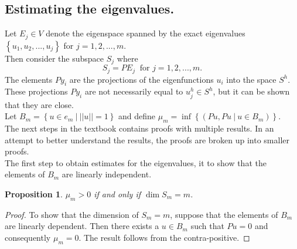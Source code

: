 \documentclass[../../main.tex]{subfiles}
\begin{document}
\subsection{Estimating the eigenvalues.}
Let $E_j \in V$ denote the eigenspace spanned by the exact eigenvalues $\left\{u_1,u_2,...,u_j \right\}$ for $j = 1,2,...,m$.\\

Then consider the subspace $S_j$ where
\begin{equation*}
	S_j = PE_j \ \text{ for } j = 1,2,...,m.
\end{equation*} The elements $Py_i$ are the projections of the eigenfunctions $u_i$ into the space $S^h$. These projections $Py_i$ are not necessarily equal to $u^h_j \in S^h$, but it can be shown that they are close.\\

Let $B_m = \left\{u \in e_m \ | \ ||u|| = 1 \right\}$ and define $\mu_m = \inf\left\{(Pu,Pu \ | \ u \in B_m)\right\}$.\\

The next steps in the textbook \cite{SF73} contains proofs with multiple results. In an attempt to better understand the results, the proofs are broken up into smaller proofs.\\

The first step to obtain estimates for the eigenvalues, it to show that the elements of $B_m$ are linearly independent.

\newtheorem{Prop_1}{Proposition}
\begin{Prop_1}
 $\mu_{m} > 0$ if and only if $\dim S_{m} = m$. \label{sym:mu}
\end{Prop_1}
\begin{proof}
	To show that the dimension of $S_m = m$, suppose that the elements of $B_m$ are linearly dependent. Then there exists a $u \in B_m$ such that $Pu = 0$ and consequently $\mu_m = 0$. The result follows from the contra-positive.
\end{proof}
\end{document}
